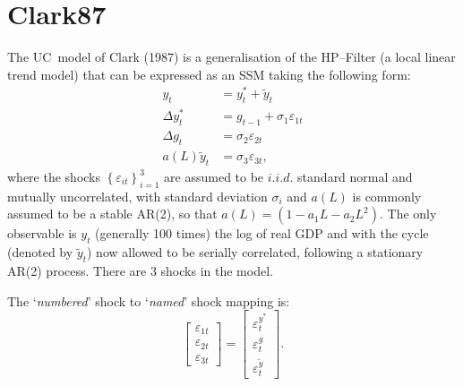 \documentclass[a4paper,12pt]{article}
\newcommand{\bsq}{\begin{subequations}}\newcommand{\esq}{\end{subequations}}
\begin{document}
\section{Clark87}

The UC\ model of Clark (1987) is a generalisation of the HP--Filter (a local
linear trend model) that can be expressed as an SSM taking the following
form:\bsq\label{clark0}%
\begin{align}
y_{t}& =y_{t}^{\ast }+\tilde{y}_{t} \\
\Delta y_{t}^{\ast }& =g_{t-1}+\sigma _{1}\varepsilon _{1t} \\
\Delta g_{t}& =\sigma _{2}\varepsilon _{2t} \\
a(L)\tilde{y}_{t}& =\sigma _{3}\varepsilon _{3t},
\end{align}%
\esq where the shocks $\left\{ \varepsilon _{it}\right\} _{i=1}^{3}$ are
assumed to be $i.i.d.$ standard normal and mutually uncorrelated, with
standard deviation $\sigma _{i}$ and $a(L)$ is commonly assumed to be a
stable AR(2), so that $a(L)=(1-a_{1}L-a_{2}L^{2})$. The only observable is $%
y_{t}$ (generally 100 times) the log of real GDP and with the cycle (denoted
by $\tilde{y}_{t}$) now allowed to be serially correlated, following a
stationary AR(2) process. There are 3 shocks in the model.

The `\emph{numbered}' shock to `\emph{named}' shock mapping is:%
\begin{equation}
\begin{bmatrix}
\varepsilon _{1t} \\ 
\varepsilon _{2t} \\ 
\varepsilon _{3t}%
\end{bmatrix}%
=%
\begin{bmatrix}
\varepsilon _{t}^{y^{\ast }} \\ 
\varepsilon _{t}^{g} \\ 
\varepsilon _{t}^{\tilde{y}}%
\end{bmatrix}%
.
\end{equation}
\end{document}
